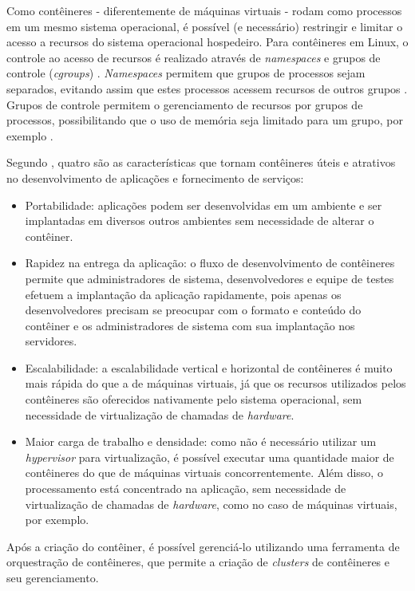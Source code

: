 Como contêineres - diferentemente de máquinas virtuais - rodam como processos em um mesmo sistema operacional, é possível (e necessário) restringir e limitar o acesso a recursos do sistema operacional hospedeiro. Para contêineres em Linux, o controle ao acesso de recursos é realizado através de \textit{namespaces} e grupos de controle (\textit{cgroups}) \cite{containers&docker}. \textit{Namespaces} permitem que grupos de processos sejam separados, evitando assim que estes processos acessem recursos de outros grupos \cite{paascontainer}. Grupos de controle permitem o gerenciamento de recursos por grupos de processos, possibilitando que o uso de memória seja limitado para um grupo, por exemplo \cite{paascontainer}.

Segundo , quatro são as características que tornam contêineres úteis e atrativos no desenvolvimento de aplicações e fornecimento de serviços:

\begin{itemize}
    \item Portabilidade: aplicações podem ser desenvolvidas em um ambiente e ser implantadas em diversos outros ambientes sem necessidade de alterar o contêiner.
    \item Rapidez na entrega da aplicação: o fluxo de desenvolvimento de contêineres permite que administradores de sistema, desenvolvedores e equipe de testes efetuem a implantação da aplicação rapidamente, pois apenas os desenvolvedores precisam se preocupar com o formato e conteúdo do contêiner e os administradores de sistema com sua implantação nos servidores.
    \item Escalabilidade: a escalabilidade vertical e horizontal de contêineres 
    é muito mais rápida do que a de máquinas virtuais, já que os recursos utilizados pelos contêineres são oferecidos nativamente pelo sistema operacional, sem necessidade de virtualização de chamadas de \textit{hardware}.
    \item Maior carga de trabalho e densidade: como não é necessário utilizar um \textit{hypervisor} para virtualização, é possível executar uma quantidade maior de contêineres do que de máquinas virtuais concorrentemente. Além disso, o processamento está concentrado na aplicação, sem necessidade de virtualização de chamadas de \textit{hardware}, como no caso de máquinas virtuais, por exemplo.
\end{itemize}

Após a criação do contêiner, é possível gerenciá-lo utilizando uma ferramenta de orquestração de contêineres, que permite a criação de \textit{clusters} de contêineres e seu gerenciamento.

